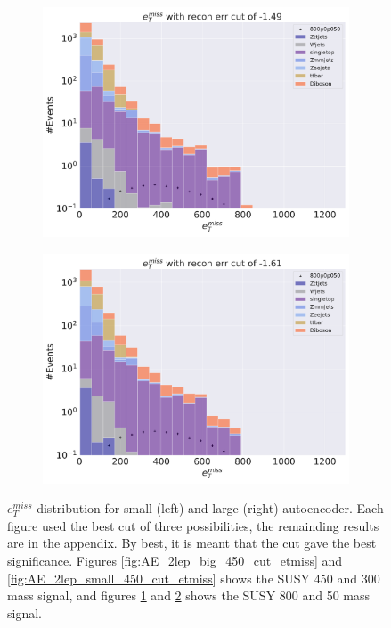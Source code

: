 \begin{figure}[H]
    \hfill
    \begin{subfigure}{.45\textwidth}
        \includegraphics[width=\textwidth]{Figures/AE_testing/big/2lep/b_data_recon_big_rm3_feats_sig_800p0p050_recon_errcut_-1.49.pdf}
        \caption{}
        \label{fig:AE_2lep_big_800_cut_etmiss}
    \end{subfigure}
    \hfill   
    \begin{subfigure}{.45\textwidth}
        \includegraphics[width=\textwidth]{Figures/AE_testing/small/2lep/b_data_recon_big_rm3_feats_sig_800p0p050_recon_errcut_-1.61.pdf}
        \caption{}
        \label{fig:AE_2lep_small_800_cut_etmiss}
    \end{subfigure}
    \hfill      
    \caption[$e_T^{miss}$ best cuts for regular autoencoder]{$e_T^{miss}$ distribution for small (left) and large (right) autoencoder.
    Each figure used the best cut of three possibilities, the remainding results are in the appendix. By best, it is meant that the cut
    gave the best significance. Figures \ref{fig:AE_2lep_big_450_cut_etmiss} and \ref{fig:AE_2lep_small_450_cut_etmiss} shows the SUSY 450 and 300 mass signal, 
    and figures \ref{fig:AE_2lep_big_800_cut_etmiss} and \ref{fig:AE_2lep_small_800_cut_etmiss} shows the SUSY 800 and 50 mass signal.}
    \label{fig:AE_2lep_recon_err_both_sig_cut_etmiss}
\end{figure}

